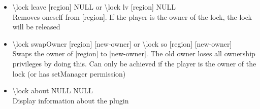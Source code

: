 \documentclass[a4paper,twoside,notitlepage,11pt]{article}
\begin{document}
\begin{itemize}
\item \textbackslash lock leave [region] NULL or \textbackslash lock lv [region] NULL\\
Removes oneself from [region]. If the player is the owner of the lock, the lock will be released
\item \textbackslash lock swapOwner [region] [new-owner] or \textbackslash lock so [region] [new-owner]\\
Swaps the owner of [region] to [new-owner]. The old owner loses all ownership privileges by doing this. Can only be achieved if the player is the owner of the lock (or has setManager permission)
\item \textbackslash lock about NULL NULL \\
Display information about the plugin
\end{itemize}
\end{document}
